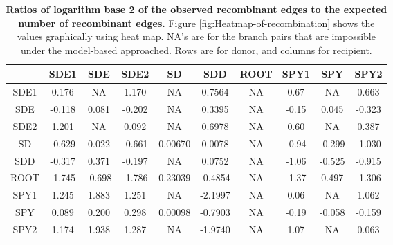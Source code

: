 \documentclass[10pt]{article}
\providecommand{\tabularnewline}{\\}
\begin{document}
\begin{table}[!ht]
\caption{
{\bf Ratios of logarithm base 2 of the observed
recombinant edges to the expected number of recombinant edges.}  Figure
\ref{fig:Heatmap-of-recombination} shows the values graphically using heat map.
NA's are for the branch pairs that are impossible under the model-based
approached. Rows are for donor, and columns for recipient.}
\noindent \centering{}\begin{tabular}{cccccccccc}
\hline
& SDE1 & SDE & SDE2 & SD & SDD & ROOT & SPY1 & SPY & SPY2 \tabularnewline
\hline
SDE1& 0.176  &   NA  &1.170  &    NA & 0.7564  & NA & 0.67 &    NA & 0.663\tabularnewline
SDE & -0.118 & 0.081 &-0.202 &     NA&  0.3395 &  NA& -0.15&  0.045& -0.323\tabularnewline
SDE2& 1.201  &   NA  &0.092  &    NA & 0.6978  & NA & 0.60 &    NA & 0.387\tabularnewline
SD  & -0.629 & 0.022 &-0.661 &0.00670&  0.0078 &  NA& -0.94& -0.299& -1.030\tabularnewline
SDD & -0.317 & 0.371 &-0.197 &     NA&  0.0752 &  NA& -1.06& -0.525& -0.915\tabularnewline
ROOT& -1.745 &-0.698 &-1.786 &0.23039& -0.4854 &  NA& -1.37&  0.497& -1.306\tabularnewline
SPY1& 1.245  &1.883  &1.251  &    NA &-2.1997  & NA & 0.06 &    NA & 1.062\tabularnewline
SPY & 0.089  &0.200  &0.298 &0.00098 &-0.7903  & NA &-0.19 &-0.058 &-0.159\tabularnewline
SPY2& 1.174  &1.938  &1.287  &    NA &-1.9740  & NA & 1.07 &    NA & 0.063\tabularnewline
\hline
\end{tabular}
\label{tab:heatmap}
\end{table}
\end{document}
